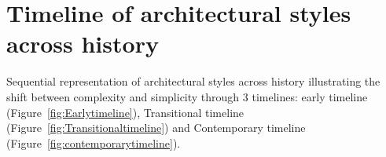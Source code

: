 %

\section{Timeline of architectural styles across history}\label{sec:timeline-of-architectural-styles-across-history}

Sequential representation of architectural styles across history illustrating the shift between complexity and simplicity through 3 timelines: early timeline (Figure~\ref{fig:Earlytimeline}), Transitional timeline (Figure~\ref{fig:Transitionaltimeline}) and Contemporary timeline (Figure~\ref{fig:contemporarytimeline}).

